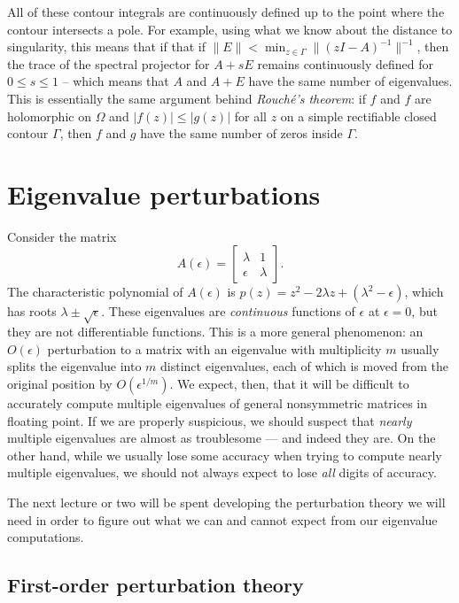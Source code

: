 \documentclass[12pt, leqno]{article} %
\begin{document}
All of these contour integrals are continuously defined up to the
point where the contour intersects a pole.  For example, using what
we know about the distance to singularity, this means that if
that if $\|E\| < \min_{z \in \Gamma} \|(zI-A)^{-1}\|^{-1}$, then
the trace of the spectral projector for $A+sE$ remains continuously
defined for $0 \leq s \leq 1$ -- which means that $A$ and $A+E$ have
the same number of eigenvalues.  This is essentially the same argument
behind {\em Rouch\'e's theorem}: if $f$ and $f$ are holomorphic on
$\Omega$ and $|f(z)| \leq |g(z)|$ for all $z$
on a simple rectifiable closed contour $\Gamma$, then $f$ and $g$ have
the same number of zeros inside $\Gamma$.

\section{Eigenvalue perturbations}

Consider the matrix
\[
  A(\epsilon) =
  \begin{bmatrix}
     \lambda & 1 \\
    \epsilon & \lambda
  \end{bmatrix}.
\]
The characteristic polynomial of $A(\epsilon)$ is $p(z) = z^2 -
2\lambda z + (\lambda^2-\epsilon)$, which has roots $\lambda \pm
\sqrt{\epsilon}$.  These eigenvalues are {\em continuous} functions of
$\epsilon$ at $\epsilon = 0$, but they are not differentiable
functions.  This is a more general phenomenon: an $O(\epsilon)$
perturbation to a matrix with an eigenvalue with multiplicity $m$
usually splits the eigenvalue into $m$ distinct eigenvalues, each of
which is moved from the original position by $O(\epsilon^{1/m})$.  We
expect, then, that it will be difficult to accurately compute multiple
eigenvalues of general nonsymmetric matrices in floating point.  If we
are properly suspicious, we should suspect that {\em nearly} multiple
eigenvalues are almost as troublesome --- and indeed they are.  On the
other hand, while we usually lose some accuracy when trying to compute
nearly multiple eigenvalues, we should not always expect to lose
{\em all} digits of accuracy.

The next lecture or two will be spent developing the perturbation
theory we will need in order to figure out what we can and cannot
expect from our eigenvalue computations.

\subsection{First-order perturbation theory}
\end{document}
